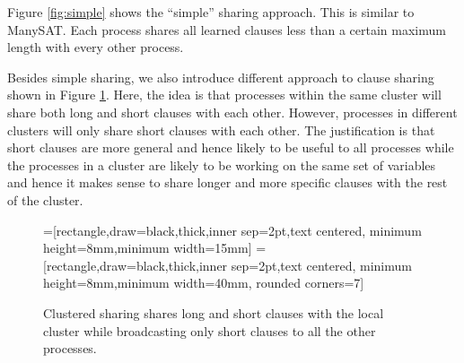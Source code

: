 \documentclass[letterpaper, compsoc, conference]{IEEEtran}
\begin{document}
Figure \ref{fig:simple} shows the ``simple'' sharing approach. This is similar
to ManySAT. Each process shares all learned clauses less than a certain maximum
length with every other process.

Besides simple sharing, we also introduce different approach to clause sharing
shown in Figure \ref{fig:cluster}.  Here, the idea is that processes within the
same cluster will share both long and short clauses with each other.  However,
processes in different clusters will only share short clauses with each other.
The justification is that short clauses are more general and hence likely to be
useful to all processes while the processes in a cluster are likely to be
working on the same set of variables and hence it makes sense to share longer
and more specific clauses with the rest of the cluster.

\begin{figure}[htbp]
    =[rectangle,draw=black,thick,inner sep=2pt,text centered,
                     minimum height=8mm,minimum width=15mm]
    =[rectangle,draw=black,thick,inner sep=2pt,text centered,
                        minimum height=8mm,minimum width=40mm, rounded corners=7]
    \begin{center}
    \end{center}
    \caption{Clustered sharing shares long and short clauses with the local cluster 
             while broadcasting only short clauses to all the other processes.}
    \label{fig:cluster}
 \end{figure}
\end{document}
